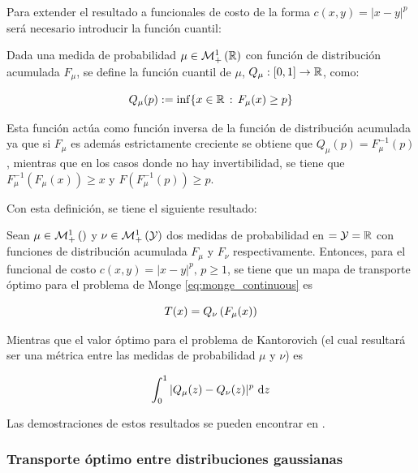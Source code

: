 Para extender el resultado a funcionales de costo de la forma $c(x,y)=|x-y|^p$ será necesario introducir la función cuantil: 

\begin{defn}
	Dada una medida de probabilidad $\mu\in\mathcal{M}_+^1\left(\mathbb{R}\right)$ con función de distribución acumulada $F_\mu$, se define la función cuantil de $\mu$, $Q_\mu:[0,1]\to\mathbb{R}$, como:

	\begin{equation*}
		Q_\mu(p) := \inf \{x\in\mathbb{R}\,:\, F_\mu(x)\geq p\}
	\end{equation*}
\end{defn}

Esta función actúa como función inversa de la función de distribución acumulada ya que si $F_\mu$ es además estrictamente creciente se obtiene que $Q_\mu(p) = F_\mu^{-1}(p)$, mientras que en los casos donde no hay invertibilidad, se tiene que $F_\mu^{-1}(F_\mu(x)) \geq x$ y $F(F_\mu^{-1}(p)) \geq p$. 

Con esta definición, se tiene el siguiente resultado:

\begin{teo}
	Sean $\mu\in\mathcal{M}_+^1\left(\right)$ y $\nu\in\mathcal{M}_+^1\left(\mathcal{Y}\right)$ dos medidas de probabilidad en $=\mathcal{Y}=\mathbb{R}$ con funciones de distribución acumulada $F_\mu$ y $F_\nu$ respectivamente. Entonces, para el funcional de costo $c(x,y)=|x-y|^p,\,p\geq 1$, se tiene que un mapa de transporte óptimo para el problema de Monge \eqref{eq:monge_continuous} es

	\begin{equation*}
		T(x) = Q_\nu\left(F_\mu(x)\right)
	\end{equation*}

	Mientras que el valor óptimo para el problema de Kantorovich (el cual resultará ser una métrica entre las medidas de probabilidad $\mu$ y $\nu$) es

	\begin{equation*}
		\int_0^1 |Q_\mu(z) - Q_\nu(z)|^p \,\operatorname{d}\! z
	\end{equation*}
\end{teo}

Las demostraciones de estos resultados se pueden encontrar en \cite{Thorpe2018}.

\subsubsection{Transporte óptimo entre distribuciones gaussianas}


